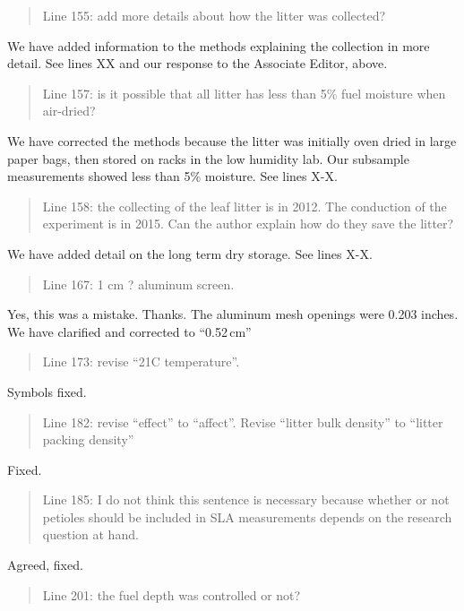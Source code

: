 \documentclass[letterpaper, 12pt]{letter}
\begin{document}
\begin{letter}{}
\begin{quote}
  Line 155: add more details about how the litter was collected?
\end{quote}

We have added information to the methods explaining the collection in more
detail. See lines XX and our response to the Associate Editor, above.

\begin{quote}
  Line 157: is it possible that all litter has less than 5\% fuel moisture when
  air-dried?
\end{quote}

We have corrected the methods because the litter was initially oven dried in
large paper bags, then stored on racks in the low humidity lab. Our subsample
measurements showed less than 5\% moisture. See lines X-X.

\begin{quote}
  Line 158: the collecting of the leaf litter is in 2012. The conduction of the
  experiment is in 2015. Can the author explain how do they save the litter?
\end{quote}

We have added detail on the long term dry storage. See lines X-X.

\begin{quote}
Line 167: 1 cm ? aluminum screen.
\end{quote}

Yes, this was a mistake. Thanks. The aluminum mesh openings were 0.203 inches.
We have clarified and corrected to ``0.52\,cm''

\begin{quote}
  Line 173: revise “21C temperature”.
\end{quote}

Symbols fixed.

\begin{quote}
  Line 182: revise “effect” to “affect”. Revise “litter bulk density” to
  “litter packing density”
\end{quote}

Fixed.

\begin{quote}
  Line 185: I do not think this sentence is necessary because whether or not
  petioles should be included in SLA measurements depends on the research
  question at hand.
\end{quote}

Agreed, fixed.

\begin{quote}
  Line 201: the fuel depth was controlled or not?
\end{quote}


\end{letter}
\end{document}
